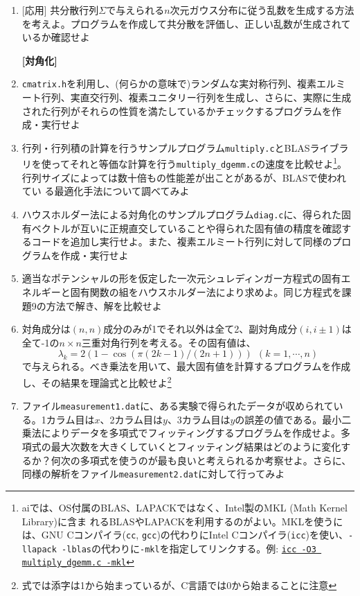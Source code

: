 \documentclass[11pt]{jarticle}
\begin{document}
\begin{enumerate}
\item \mbox{} [応用] 共分散行列$\Sigma$で与えられる$n$次元ガウス分布に従う乱数を生成する方法を考えよ。プログラムを作成して共分散を評価し、正しい乱数が生成されているか確認せよ

  \hspace*{-2em} {\bf [対角化]}
    
\item {\tt cmatrix.h}を利用し、(何らかの意味で)ランダムな実対称行列、複素エルミート行列、実直交行列、複素ユニタリー行列を生成し、さらに、実際に生成された行列がそれらの性質を満たしているかチェックするプログラムを作成・実行せよ

  \item 行列・行列積の計算を行うサンプルプログラム{\tt multiply.c}とBLASライブラリを使ってそれと等価な計算を行う{\tt multiply\_dgemm.c}の速度を比較せよ\footnote{aiでは、OS付属のBLAS、LAPACKではなく、Intel製のMKL (Math Kernel Library)に含ま
れるBLASやLAPACKを利用するのがよい。MKLを使うには、GNU Cコンパイラ({\tt cc}, {\tt gcc})の代わりにIntel Cコンパイラ({\tt icc})を使い、{\tt -llapack -lblas}の代わりに{\tt -mkl}を指定してリンクする。例: \underline{\tt icc -O3 multiply\_dgemm.c -mkl}}。行列サイズによっては数十倍もの性能差が出ことがあるが、BLASで使われてい
る最適化手法について調べてみよ

\item ハウスホルダー法による対角化のサンプルプログラム{\tt diag.c}に、得られた固有ベクトルが互いに正規直交していることや得られた固有値の精度を確認するコードを追加し実行せよ。また、複素エルミート行列に対して同様のプログラムを作成・実行せよ

\item 適当なポテンシャルの形を仮定した一次元シュレディンガー方程式の固有エネルギーと固有関数の組をハウスホルダー法により求めよ。同じ方程式を課題9の方法で解き、解を比較せよ

\item 対角成分は$(n,n)$成分のみが1でそれ以外は全て2、副対角成分$(i, i \pm 1)$は全て-1の$n \times n$三重対角行列を考える。その固有値は、
  \[ \lambda_k = 2 (1 - \cos (\pi (2 k - 1) / (2 n + 1))) \ \ (k=1,\cdots,n)\]
  で与えられる。べき乗法を用いて、最大固有値を計算するプログラムを作成し、その結果を理論式と比較せよ\footnote{式では添字は1から始まっているが、C言語では0から始まることに注意}

\item ファイル{\tt measurement1.dat}に、ある実験で得られたデータが収められている。1カラム目は$x$、2カラム目は$y$、3カラム目は$y$の誤差の値である。最小二乗法によりデータを多項式でフィッティングするプログラムを作成せよ。多項式の最大次数を大きくしていくとフィッティング結果はどのように変化するか？何次の多項式を使うのが最も良いと考えられるか考察せよ。さらに、同様の解析をファイル{\tt measurement2.dat}に対して行ってみよ


\end{enumerate}
\end{document}
